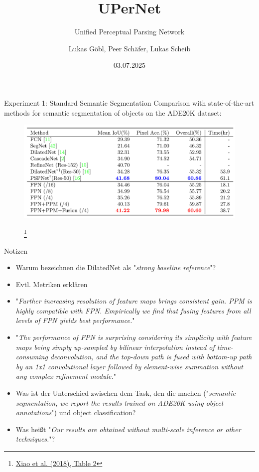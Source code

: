 \documentclass{beamer}
\title[UPerNet]{UPerNet}
\subtitle{Unified Perceptual Parsing Network}
\author[Göbl, Schäfer, Scheib]{Lukas Göbl, Peer Schäfer, Lukas Scheib}
\institute{Computer Vision Journal Club\\
University of Cologne}
\date{03.07.2025}
\newcommand{\new}[1]{{\color{red}#1}}
\newcommand\blfootnote[1]{
  \begingroup
  \renewcommand\thefootnote{}\footnote{#1}
  \addtocounter{footnote}{-1}
  \endgroup
}
\begin{document}
\begingroup
{}
\maketitle
\endgroup
\addtocounter{framenumber}{1}

\begin{frame}{Experiment 1: Standard Semantic Segmentation}
  Comparison with state-of-the-art methods for semantic segmentation of objects on the ADE20K dataset:
  \begin{figure}
    \centering
    \includegraphics[width=\textwidth]{Images/Table2.png}
    \blfootnote{\href{https://doi.org/10.48550/arXiv.1807.10221}{Xiao et al. (2018), Table 2}}
  \end{figure}
\end{frame}

\begin{frame}{\new{Notizen}}
  \footnotesize
  \begin{itemize}
    \item Warum bezeichnen die DilatedNet als "\emph{strong baseline reference}"?
    \item Evtl. Metriken erklären
    \item "\emph{Further increasing resolution of feature maps brings consistent gain. PPM is highly compatible with FPN. Empirically we find that fusing features from all levels of FPN yields best performance.}"
    \item "\emph{The performance of FPN is surprising considering its simplicity with feature maps being simply up-sampled by bilinear interpolation instead of time-consuming deconvolution, and the top-down path is fused with bottom-up path by an 1x1 convolutional layer followed by element-wise summation without any complex refinement module.}"
    \item Was ist der Unterschied zwischen dem Task, den die machen ("\emph{semantic segmentation, we report the results trained on ADE20K using object annotations}") und object classification?
    \item Was heißt "\emph{Our results are obtained without multi-scale inference or other techniques.}"?
  \end{itemize}
\end{frame}
\end{document}
